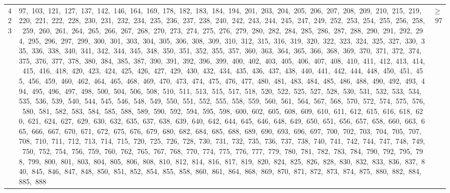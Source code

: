 \begin{longtable}{c|p{}|r}
423 & 97,\ 103,\ 121,\ 127,\ 137,\ 142,\ 146,\ 164,\ 169,\ 178,\ 182,\ 183,\ 184,\ 194,\ 201,\ 203,\ 204,\ 205,\ 206,\ 207,\ 208,\ 209,\ 210,\ 215,\ 219,\ 220,\ 221,\ 222,\ 228,\ 230,\ 231,\ 232,\ 234,\ 235,\ 236,\ 237,\ 238,\ 240,\ 242,\ 243,\ 244,\ 245,\ 247,\ 249,\ 252,\ 253,\ 254,\ 255,\ 256,\ 258,\ 259,\ 260,\ 261,\ 264,\ 265,\ 266,\ 267,\ 268,\ 270,\ 273,\ 274,\ 275,\ 276,\ 279,\ 280,\ 282,\ 284,\ 285,\ 286,\ 287,\ 288,\ 290,\ 291,\ 292,\ 294,\ 295,\ 296,\ 297,\ 299,\ 300,\ 301,\ 303,\ 304,\ 305,\ 306,\ 308,\ 309,\ 310,\ 312,\ 315,\ 316,\ 319,\ 320,\ 322,\ 323,\ 324,\ 325,\ 327,\ 330,\ 335,\ 336,\ 338,\ 340,\ 341,\ 342,\ 344,\ 345,\ 348,\ 350,\ 351,\ 352,\ 355,\ 357,\ 360,\ 363,\ 364,\ 365,\ 366,\ 368,\ 369,\ 370,\ 371,\ 372,\ 374,\ 375,\ 376,\ 377,\ 378,\ 380,\ 384,\ 385,\ 387,\ 390,\ 391,\ 392,\ 396,\ 399,\ 400,\ 402,\ 403,\ 405,\ 406,\ 407,\ 408,\ 410,\ 411,\ 412,\ 413,\ 414,\ 415,\ 416,\ 418,\ 420,\ 423,\ 424,\ 425,\ 426,\ 427,\ 429,\ 430,\ 432,\ 434,\ 435,\ 436,\ 437,\ 438,\ 440,\ 441,\ 442,\ 444,\ 448,\ 450,\ 451,\ 455,\ 456,\ 459,\ 460,\ 462,\ 464,\ 465,\ 468,\ 469,\ 470,\ 473,\ 474,\ 475,\ 476,\ 477,\ 480,\ 481,\ 483,\ 484,\ 485,\ 486,\ 488,\ 490,\ 492,\ 493,\ 494,\ 495,\ 496,\ 497,\ 498,\ 500,\ 504,\ 506,\ 508,\ 510,\ 511,\ 513,\ 515,\ 517,\ 518,\ 520,\ 522,\ 525,\ 527,\ 528,\ 530,\ 531,\ 532,\ 533,\ 534,\ 535,\ 536,\ 539,\ 540,\ 544,\ 545,\ 546,\ 548,\ 549,\ 550,\ 551,\ 552,\ 555,\ 558,\ 559,\ 560,\ 561,\ 564,\ 567,\ 568,\ 570,\ 572,\ 574,\ 575,\ 576,\ 580,\ 581,\ 582,\ 583,\ 584,\ 585,\ 588,\ 589,\ 590,\ 592,\ 594,\ 595,\ 598,\ 600,\ 602,\ 605,\ 608,\ 609,\ 610,\ 611,\ 612,\ 615,\ 616,\ 618,\ 620,\ 621,\ 624,\ 627,\ 629,\ 630,\ 632,\ 635,\ 637,\ 638,\ 639,\ 640,\ 642,\ 644,\ 645,\ 646,\ 648,\ 649,\ 650,\ 651,\ 656,\ 657,\ 658,\ 660,\ 663,\ 665,\ 666,\ 667,\ 670,\ 671,\ 672,\ 675,\ 676,\ 679,\ 680,\ 682,\ 684,\ 685,\ 688,\ 689,\ 690,\ 693,\ 696,\ 697,\ 700,\ 702,\ 703,\ 704,\ 705,\ 707,\ 708,\ 710,\ 711,\ 712,\ 713,\ 714,\ 715,\ 720,\ 725,\ 726,\ 728,\ 730,\ 731,\ 732,\ 735,\ 736,\ 737,\ 738,\ 740,\ 741,\ 742,\ 744,\ 747,\ 748,\ 749,\ 750,\ 752,\ 754,\ 756,\ 759,\ 760,\ 762,\ 765,\ 767,\ 768,\ 770,\ 774,\ 775,\ 776,\ 777,\ 779,\ 780,\ 781,\ 782,\ 783,\ 784,\ 790,\ 792,\ 795,\ 798,\ 799,\ 800,\ 801,\ 803,\ 804,\ 805,\ 806,\ 808,\ 810,\ 812,\ 814,\ 816,\ 817,\ 819,\ 820,\ 824,\ 825,\ 826,\ 828,\ 830,\ 832,\ 833,\ 836,\ 837,\ 840,\ 845,\ 846,\ 847,\ 848,\ 850,\ 851,\ 852,\ 854,\ 855,\ 858,\ 860,\ 861,\ 864,\ 868,\ 869,\ 870,\ 871,\ 872,\ 873,\ 874,\ 875,\ 880,\ 882,\ 884,\ 885,\ 888 & $\ge$ 97 \\

\end{longtable}
